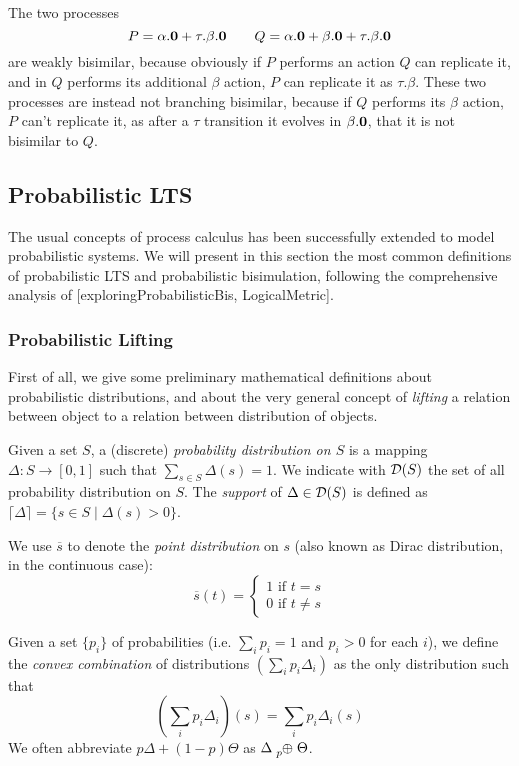 The two processes \[P = \alpha.\mathbf{0} + \tau.\beta.\mathbf{0} \qquad Q = \alpha.\mathbf{0} + \beta.\mathbf{0} + \tau.\beta.\mathbf{0}\] are weakly bisimilar, because obviously if $P$ performs an action $Q$ can replicate it, and in $Q$ performs its additional $\beta$ action, $P$ can replicate it as $\tau.\beta$. These two processes are instead not branching bisimilar, because if $Q$ performs its $\beta$ action, $P$ can't replicate it, as after a $\tau$ transition it evolves in $\beta.\mathbf{0}$, that it is not bisimilar to $Q$.

\subsection{Probabilistic LTS} \label{pLTS}

The usual concepts of process calculus has been successfully extended to model probabilistic systems. We will present in this section the most common definitions of probabilistic LTS and probabilistic bisimulation, following the comprehensive analysis of [exploringProbabilisticBis, LogicalMetric].

\subsubsection{Probabilistic Lifting}
First of all, we give some preliminary mathematical definitions about probabilistic distributions, and about the very general concept of \textit{lifting} a relation between object to a relation between distribution of objects.

Given a set $S$, a (discrete) \textit{probability distribution on $S$} is a mapping $\Delta: S \rightarrow [0, 1]$ such that $\sum_{s\in S} \Delta(s) = 1$. We indicate with $\mathcal{D}(S)$ the set of all probability distribution on $S$.
The \textit{support} of $\Delta \in \mathcal{D}(S)$ is defined as $\lceil\Delta\rceil = \{s \in S \mid \Delta(s) > 0\}$.

We use $\overline{s}$ to denote the \textit{point distribution} on $s$ (also known as Dirac distribution, in the continuous case):
\[
	\overline{s}(t) = 
	\begin{cases} 1 \text{ if }t = s \\
	0 \text{ if } t\neq s
	\end{cases}
\]

Given a set $\{p_i\}$ of probabilities (i.e. $\sum_i p_i = 1$ and $p_i > 0$ for each $i$), we define the \textit{convex combination} of distributions $\left(\sum_i p_i \Delta_i\right)$ as the only 
distribution such that
\[
\left(\sum_i p_i \Delta_i\right)(s) = \sum_i p_i \Delta_i(s)
\]
We often abbreviate $p \Delta + (1-p) \Theta$ as $\Delta \psum{p} \Theta$.

